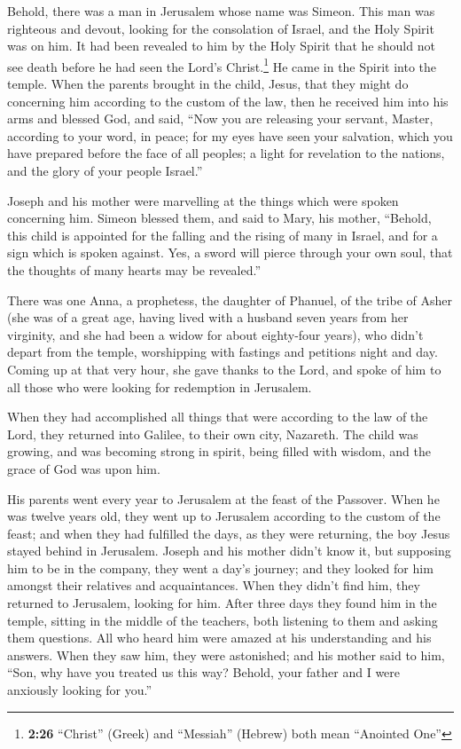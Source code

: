  Behold, there was a man in Jerusalem whose name was
Simeon. This man was righteous and devout, looking for the consolation
of Israel, and the Holy Spirit was on him.  It had been
revealed to him by the Holy Spirit that he should not see death before
he had seen the Lord's Christ.\footnote{\textbf{2:26} ``Christ'' (Greek)
  and ``Messiah'' (Hebrew) both mean ``Anointed One''} 
He came in the Spirit into the temple. When the parents brought in the
child, Jesus, that they might do concerning him according to the custom
of the law,  then he received him into his arms and
blessed God, and said,  ``Now you are releasing your
servant, Master, according to your word, in peace;  for
my eyes have seen your salvation,  which you have
prepared before the face of all peoples;  a light for
revelation to the nations, and the glory of your people Israel.''

 Joseph and his mother were marvelling at the things
which were spoken concerning him.  Simeon blessed them,
and said to Mary, his mother, ``Behold, this child is appointed for the
falling and the rising of many in Israel, and for a sign which is spoken
against.  Yes, a sword will pierce through your own soul,
that the thoughts of many hearts may be revealed.''

 There was one Anna, a prophetess, the daughter of
Phanuel, of the tribe of Asher (she was of a great age, having lived
with a husband seven years from her virginity,  and she
had been a widow for about eighty-four years), who didn't depart from
the temple, worshipping with fastings and petitions night and day.
 Coming up at that very hour, she gave thanks to the
Lord, and spoke of him to all those who were looking for redemption in
Jerusalem.

 When they had accomplished all things that were
according to the law of the Lord, they returned into Galilee, to their
own city, Nazareth.  The child was growing, and was
becoming strong in spirit, being filled with wisdom, and the grace of
God was upon him.

 His parents went every year to Jerusalem at the feast of
the Passover.  When he was twelve years old, they went up
to Jerusalem according to the custom of the feast;  and
when they had fulfilled the days, as they were returning, the boy Jesus
stayed behind in Jerusalem. Joseph and his mother didn't know it,
 but supposing him to be in the company, they went a
day's journey; and they looked for him amongst their relatives and
acquaintances.  When they didn't find him, they returned
to Jerusalem, looking for him.  After three days they
found him in the temple, sitting in the middle of the teachers, both
listening to them and asking them questions.  All who
heard him were amazed at his understanding and his answers.
 When they saw him, they were astonished; and his mother
said to him, ``Son, why have you treated us this way? Behold, your
father and I were anxiously looking for you.''

